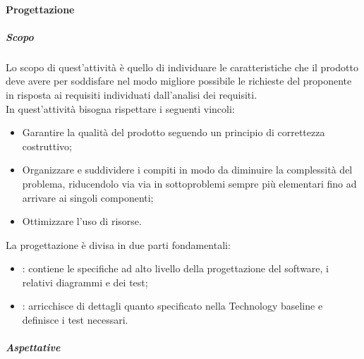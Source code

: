 \paragraph{Progettazione}
\label{ssub:progettazione}

\subparagraph{Scopo}
\label{par:progettazione:scopo}
Lo scopo di quest'attività è quello di individuare le caratteristiche che il prodotto deve avere per soddisfare nel
modo migliore possibile le richieste del proponente in risposta ai requisiti individuati dall'analisi dei requisiti. \\
In quest'attività bisogna rispettare i seguenti vincoli:
\begin{itemize}
    \item Garantire la qualità del prodotto seguendo un principio di correttezza costruttivo;
    \item Organizzare e suddividere i compiti in modo da diminuire la complessità del problema, riducendolo via via in
    sottoproblemi sempre più elementari fino ad arrivare ai singoli componenti;
    \item Ottimizzare l'uso di risorse.
\end{itemize}

La progettazione è divisa in due parti fondamentali:
\begin{itemize}
    \item {}: contiene le specifiche ad alto livello della progettazione del software,
    i relativi diagrammi  e dei test;
    \item {}: arricchisce di dettagli quanto specificato nella Technology baseline e
    definisce i test necessari.
\end{itemize}

\subparagraph{Aspettative}

